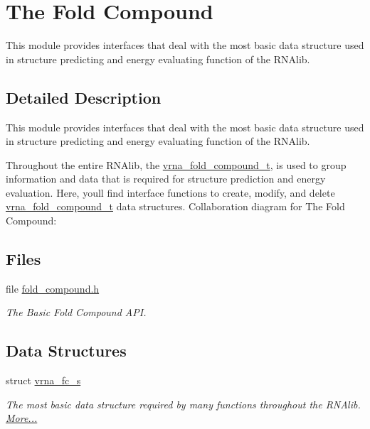 \hypertarget{group__fold__compound}{}\section{The Fold Compound}
\label{group__fold__compound}


This module provides interfaces that deal with the most basic data structure used in structure predicting and energy evaluating function of the R\+N\+Alib.  




\subsection{Detailed Description}
This module provides interfaces that deal with the most basic data structure used in structure predicting and energy evaluating function of the R\+N\+Alib. 

Throughout the entire R\+N\+Alib, the \mbox{\hyperlink{group__fold__compound_ga1b0cef17fd40466cef5968eaeeff6166}{vrna\+\_\+fold\+\_\+compound\+\_\+t}}, is used to group information and data that is required for structure prediction and energy evaluation. Here, you\textquotesingle{}ll find interface functions to create, modify, and delete \mbox{\hyperlink{group__fold__compound_ga1b0cef17fd40466cef5968eaeeff6166}{vrna\+\_\+fold\+\_\+compound\+\_\+t}} data structures. Collaboration diagram for The Fold Compound\+:
\subsection*{Files}
\begin{DoxyCompactItemize}
\item 
file \mbox{\hyperlink{fold__compound_8h}{fold\+\_\+compound.\+h}}
\begin{DoxyCompactList}\small\item\em The Basic Fold Compound A\+PI. \end{DoxyCompactList}\end{DoxyCompactItemize}
\subsection*{Data Structures}
\begin{DoxyCompactItemize}
\item 
struct \mbox{\hyperlink{group__fold__compound_structvrna__fc__s}{vrna\+\_\+fc\+\_\+s}}
\begin{DoxyCompactList}\small\item\em The most basic data structure required by many functions throughout the R\+N\+Alib.  \mbox{\hyperlink{group__fold__compound_structvrna__fc__s}{More...}}\end{DoxyCompactList}\end{DoxyCompactItemize}
